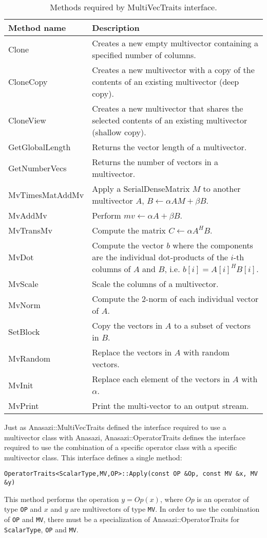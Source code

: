 \begin{table}
\begin{center}
\begin{tabular}{| p{4cm} || p{8cm} |}
\hline
Method name & Description \\
\hline\hline
Clone           & Creates a new empty multivector containing a specified number of columns.  \\\hline
CloneCopy       & Creates a new multivector with a copy of the contents of an existing multivector (deep copy). \\\hline
CloneView       & Creates a new multivector that shares the selected contents of an existing multivector (shallow copy).  \\\hline
GetGlobalLength & Returns the vector length of a multivector.  \\\hline
GetNumberVecs   & Returns the number of vectors in a multivector.  \\\hline
MvTimesMatAddMv & Apply a SerialDenseMatrix $M$ to another multivector $A$, $B \leftarrow \alpha A M + \beta B$.  \\\hline
MvAddMv         & Perform $mv \leftarrow \alpha A + \beta B$.  \\\hline
MvTransMv       & Compute the matrix $C \leftarrow \alpha A^H B$.  \\\hline
MvDot           & Compute the vector $b$ where the components are the individual dot-products of the $i$-th columns of $A$ and $B$, i.e. $b[i] = A[i]^H B[i]$.  \\\hline
MvScale         & Scale the columns of a multivector. \\\hline
MvNorm          & Compute the 2-norm of each individual vector of $A$.  \\\hline
SetBlock        & Copy the vectors in $A$ to a subset of vectors in $B$. \\\hline
MvRandom        & Replace the vectors in $A$ with random vectors.  \\\hline
MvInit          & Replace each element of the vectors in $A$ with $\alpha$.  \\\hline
MvPrint         & Print the multi-vector to an output stream.  \\\hline
\hline
\end{tabular}
\caption{Methods required by MultiVecTraits interface.}
\label{tab:anasazi:mvt}
\end{center}
\end{table}

Just as Anasazi::MultiVecTraits defined the interface required to use a
multivector class with Anasazi, Anasazi::OperatorTraits defines the
interface required to use the combination of a specific operator class with a
specific multivector class. This interface defines a single method:
\begin{verbatim}
OperatorTraits<ScalarType,MV,OP>::Apply(const OP &Op, const MV &x, MV &y)
\end{verbatim}
This method performs the operation $y = Op(x)$, where $Op$ is an operator of type
\verb!OP! and $x$ and $y$ are multivectors of type \verb!MV!. In order to use the
combination of \verb!OP! and \verb!MV!, there must be a specialization of
Anasazi::OperatorTraits for \verb!ScalarType!, \verb!OP! and \verb!MV!. 

